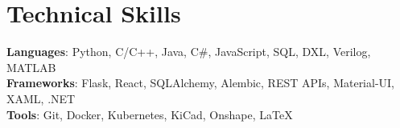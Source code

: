 \documentclass[letterpaper,11pt]{article}
\begin{document}
\section{Technical Skills}
 \begin{itemize}[leftmargin=0.15in, label={}]
    \small{\item{
     \textbf{Languages}{: Python, C/C++, Java, C\#, JavaScript, SQL, DXL, Verilog, MATLAB} \\
     \textbf{Frameworks}{: Flask, React, SQLAlchemy, Alembic, REST APIs, Material-UI, XAML, .NET} \\
     \textbf{Tools}{: Git, Docker, Kubernetes, KiCad, Onshape, LaTeX}
    }}
 \end{itemize}


\end{document}
